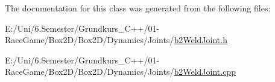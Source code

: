 The documentation for this class was generated from the following files\+:\begin{DoxyCompactItemize}
\item 
E\+:/\+Uni/6.\+Semester/\+Grundkurs\+\_\+\+C++/01-\/\+Race\+Game/\+Box2\+D/\+Box2\+D/\+Dynamics/\+Joints/\mbox{\hyperlink{b2_weld_joint_8h}{b2\+Weld\+Joint.\+h}}\item 
E\+:/\+Uni/6.\+Semester/\+Grundkurs\+\_\+\+C++/01-\/\+Race\+Game/\+Box2\+D/\+Box2\+D/\+Dynamics/\+Joints/\mbox{\hyperlink{b2_weld_joint_8cpp}{b2\+Weld\+Joint.\+cpp}}\end{DoxyCompactItemize}
